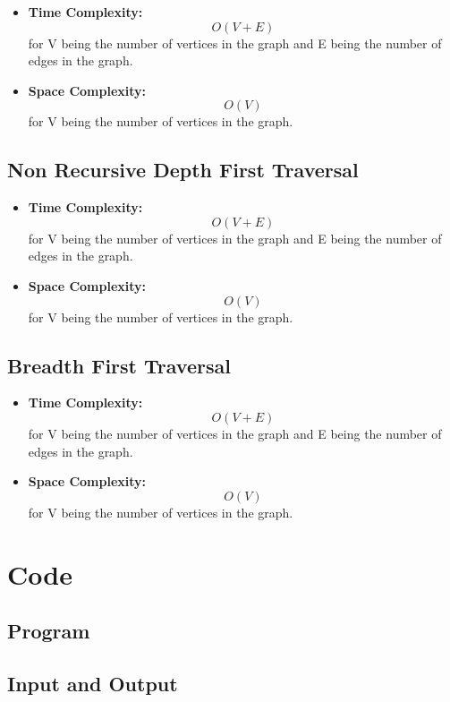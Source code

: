 \documentclass[11pt]{article}
\begin{document}
\begin{itemize}
    \item \textbf{Time Complexity:} \[O(V+E)\] for V being the number of vertices in the graph and E being the number of edges in the graph.
    \item \textbf{Space Complexity:} \[O(V)\] for V being the number of vertices in the graph.
\end{itemize}

\subsection{Non Recursive Depth First Traversal}

\begin{itemize}
    \item \textbf{Time Complexity:} \[O(V+E)\] for V being the number of vertices in the graph and E being the number of edges in the graph.
    \item \textbf{Space Complexity:} \[O(V)\] for V being the number of vertices in the graph.
\end{itemize}


\subsection{Breadth First Traversal}

\begin{itemize}
    \item \textbf{Time Complexity:} \[O(V+E)\] for V being the number of vertices in the graph and E being the number of edges in the graph.
    \item \textbf{Space Complexity:} \[O(V)\] for V being the number of vertices in the graph.
\end{itemize}


\section{Code}

\subsection{Program}


\subsection{Input and Output}

\end{document}
